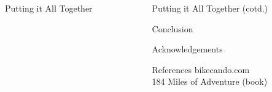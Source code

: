 \documentclass{beamer}
\newlength{\sepwidth}
\newlength{\colwidth}
\newcommand{\separatorcolumn}{\begin{column}{\sepwidth}\end{column}}
\begin{document}
\begin{frame}[t]
\begin{columns}[t]
\begin{column}{\colwidth}
\begin{block}{Putting it All Together}
\end{block}
\end{column}
\separatorcolumn
\begin{column}{\colwidth}
\begin{block}{Putting it All Together (cotd.)}
\end{block}
\begin{block}{Conclusion}

\end{block}
\begin{block}{Acknowledgements}

\end{block}
\begin{block}{References}
bikecando.com\\
184 Miles of Adventure (book) 
\end{block}
\end{column}
\separatorcolumn
\end{columns}
\end{frame}
\end{document}
